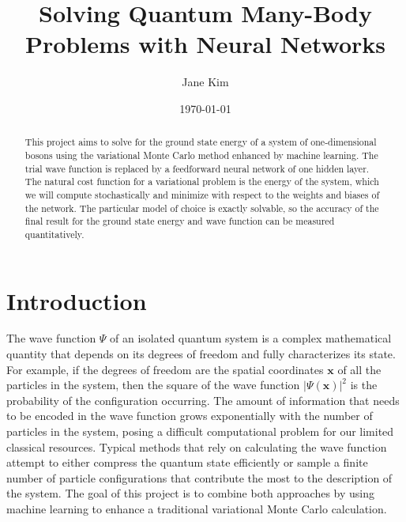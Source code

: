 \documentclass[prb,aps,twocolumn,showpacs,10pt]{revtex4-1}
\begin{document}
\title {Solving Quantum Many-Body Problems with Neural Networks}
\author{Jane Kim}
\date{\today}
\begin{abstract}
\vspace*{3mm}
This project aims to solve for the ground state energy of a system of one-dimensional bosons using the variational Monte Carlo method enhanced by machine learning. The trial wave function is replaced by a feedforward neural network of one hidden layer. The natural cost function for a variational problem is the energy of the system, which we will compute stochastically and minimize with respect to the weights and biases of the network. The particular model of choice is exactly solvable, so the accuracy of the final result for the ground state energy and wave function can be measured quantitatively.
\end{abstract}

\maketitle


\section{Introduction}

The wave function $\Psi$ of an isolated quantum system is a complex mathematical quantity that depends on its degrees of freedom and fully characterizes its state. For example, if the degrees of freedom are the spatial coordinates $\bm{x}$ of all the particles in the system, then the square of the wave function $| \Psi(\bm{x}) |^2$ is the probability of the configuration occurring. The amount of information that needs to be encoded in the wave function grows exponentially with the number of particles in the system, posing a difficult computational problem for our limited classical resources. Typical methods that rely on calculating the wave function attempt to either compress the quantum state efficiently or sample a finite number of particle configurations that contribute the most to the description of the system. The goal of this project is to combine both approaches by using machine learning to enhance a traditional variational Monte Carlo calculation. 

\end{document}
